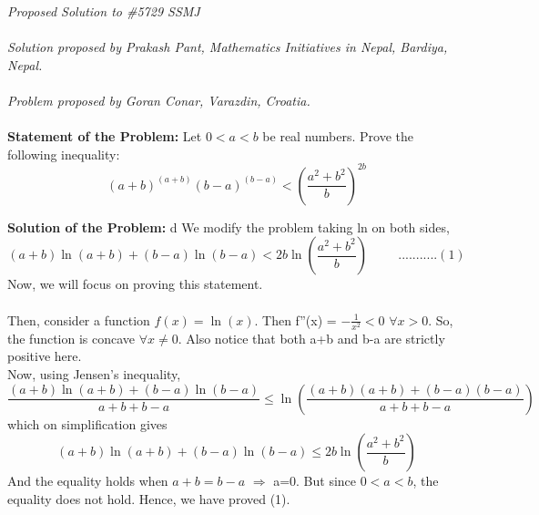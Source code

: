 \documentclass[12pt]{article}
\begin{document}
\textit{Proposed Solution to \#5729 SSMJ }\\ \\
\textit{Solution proposed by Prakash Pant, Mathematics Initiatives in Nepal, Bardiya, Nepal.}\\ \\
\textit{Problem proposed by Goran Conar, Varazdin, Croatia.} \\ \\
\textbf{Statement of the Problem:}
 Let $0<a<b$ be real numbers. Prove the following inequality:\\
\[ (a+b)^{(a+b)} (b-a)^{(b-a)} < (\frac{a^2 + b^2}{b})^{2b}  \]


\textbf{Solution of the Problem:} 		d			
We modify the problem taking ln on both sides, \\
\[ 	(a+b)\ln(a+b)+(b-a)\ln(b-a) < 2b \ln(\frac{a^2+b^2}{b})	 \hspace{1cm} ...........(1)				\]
Now, we will focus on proving this statement. \\ \\ 
Then, consider a function $ f(x) =  \ln(x)$. Then f''(x) = $-\frac{1}{x^2}<0$ $\forall x>0 $. So, the function is concave $\forall x \neq 0$. Also notice that both a+b and b-a are strictly positive here.  \\
Now, using Jensen's inequality,\\
\[  \frac{(a+b) \ln(a+b)+(b-a)\ln(b-a)}{a+b+b-a} \le \ln(\frac{(a+b)(a+b)+(b-a)(b-a)}{a+b+b-a})		\]		
which on simplification gives 
\[(a+b)\ln(a+b)+(b-a)\ln(b-a) \le 2b \ln(\frac{a^2+b^2}{b})						\]	
And the equality holds when $ a+b = b-a$ $\Rightarrow$ a=0. But since $0<a<b$, the equality does not hold. Hence, we have proved (1).
					
\end{document}
